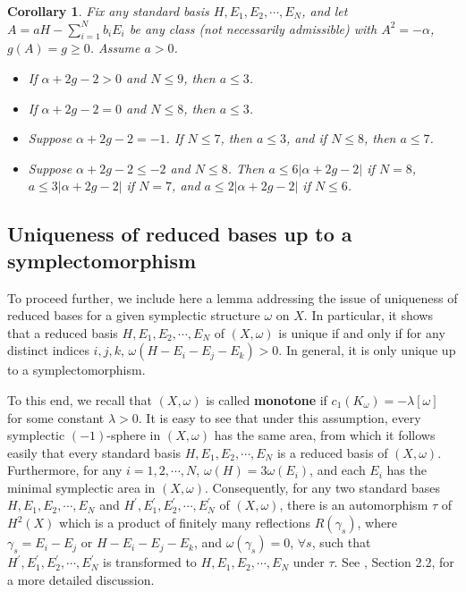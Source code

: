 \documentclass[11pt]{amsart}
\theoremstyle{plain}
\numberwithin{theorem}{section}
\newtheorem{corollary}[theorem]{Corollary}
\theoremstyle{definition}
\begin{document}
\begin{corollary}
Fix any standard basis $H,E_1,E_2,\cdots,E_N$, and let $A=aH-\sum_{i=1}^N b_i E_i$ be any class (not necessarily admissible) with $A^2=-\alpha$, $g(A)=g\geq 0$.  Assume $a>0$. 
\begin{itemize}
\item [{(1)}] If $\alpha+2g-2>0$ and $N\leq 9$, then $a\leq 3$. 
\item [{(2)}] If $\alpha+2g-2=0$ and $N\leq 8$, then $a\leq 3$.
\item [{(3)}] Suppose $\alpha+2g-2=-1$. If $N\leq 7$, then $a\leq 3$, and if $N\leq 8$, then $a\leq 7$. 
\item [{(4)}] Suppose $\alpha+2g-2\leq -2$ and $N\leq 8$. Then $a\leq 6|\alpha+2g-2|$ if $N=8$, 
$a\leq 3|\alpha+2g-2|$ if $N=7$, and $a\leq 2|\alpha+2g-2|$ if $N\leq 6$.
\end{itemize}
\end{corollary}

\subsection{Uniqueness of reduced bases up to a symplectomorphism}
To proceed further, we include here a lemma addressing the issue of uniqueness of reduced bases for a given
symplectic structure $\omega$ on $X$. In particular, it shows that a reduced basis $H,E_1,E_2, \cdots,E_N$ 
of $(X,\omega)$ is unique if and only if  for any distinct indices $i,j,k$, $\omega(H-E_i-E_j-E_k)>0$. In general,
it is only unique up to a symplectomorphism.

To this end, we recall that $(X,\omega)$ is called {\bf monotone} if $c_1(K_\omega)=-\lambda [\omega]$ 
for some constant $\lambda>0$. It is easy to see that under this assumption, every symplectic $(-1)$-sphere 
in $(X,\omega)$ has the same area, from which it follows easily that every standard basis 
$H,E_1,E_2,\cdots,E_N$ is a reduced basis of $(X,\omega)$. Furthermore, for any $i=1,2,\cdots, N$, 
$\omega(H)=3\omega(E_i)$, and each $E_i$ has the minimal symplectic area in $(X,\omega)$. Consequently, 
for any two standard bases $H,E_1,E_2,\cdots,E_N$ and $H^\prime,E_1^\prime,E_2^\prime,\cdots,E_N^\prime$
of $(X,\omega)$, there is an automorphism $\tau$ of $H^2(X)$ which is a product of finitely many reflections $R(\gamma_s)$, where $\gamma_s=E_i-E_j$ or $H-E_i-E_j-E_k$, and  $\omega(\gamma_s)=0$, $\forall s$, 
such that $H^\prime,E_1^\prime,E_2^\prime,\cdots,E_N^\prime$ is transformed to $H,E_1,E_2,\cdots,E_N$ 
under $\tau$. See \cite{CLW}, Section 2.2, for a more detailed discussion. 
\end{document}
